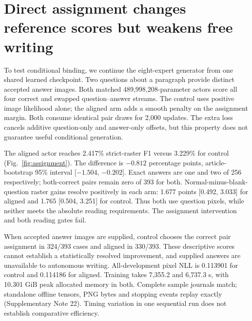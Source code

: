 
\section*{Direct assignment changes reference scores but weakens free writing}
To test conditional binding, we continue the eight-expert generator from one
shared learned checkpoint. Two questions about a paragraph provide distinct
accepted answer images. Both matched 489,998,208-parameter actors score all
four correct and swapped question--answer streams. The control uses positive
image likelihood alone; the aligned arm adds a smooth penalty on the
assignment margin. Both consume identical pair draws for 2,000 updates.
The extra loss cancels additive question-only and answer-only offsets, but
this property does not guarantee useful conditional generation.

The aligned actor reaches 2.417\% strict-raster F1 versus 3.229\% for control
(Fig.~\ref{fig:assignment}). The difference is $-0.812$ percentage points,
article-bootstrap 95\% interval [$-1.504$, $-0.202$]. Exact answers are one
and two of 256 respectively; both-correct pairs remain zero of 393 for both.
Normal-minus-blank-question raster gains resolve positively in each arm:
1.677 points [0.492, 3.033] for aligned and 1.765 [0.504, 3.251] for control.
Thus both use question pixels, while neither meets the absolute reading
requirements. The assignment intervention and both reading gates fail.

When accepted answer images are supplied, control chooses the correct pair
assignment in 324/393 cases and aligned in 330/393. These descriptive scores
cannot establish a statistically resolved improvement, and supplied answers
are unavailable to autonomous writing. All-development pixel NLL is 0.113901
for control and 0.114186 for aligned. Training takes 7,355.2 and 6,737.3 s,
with 10.301 GiB peak allocated memory in both. Complete sample journals match;
standalone offline tensors, PNG bytes and stopping events replay exactly
(Supplementary Note 22). Timing variation in one sequential run does not
establish comparative efficiency.

